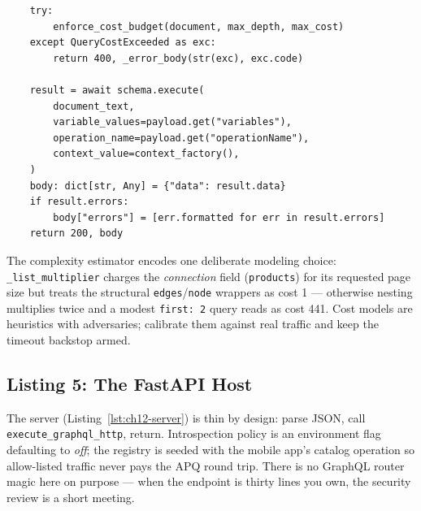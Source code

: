 \begin{verbatim}
    try:
        enforce_cost_budget(document, max_depth, max_cost)
    except QueryCostExceeded as exc:
        return 400, _error_body(str(exc), exc.code)

    result = await schema.execute(
        document_text,
        variable_values=payload.get("variables"),
        operation_name=payload.get("operationName"),
        context_value=context_factory(),
    )
    body: dict[str, Any] = {"data": result.data}
    if result.errors:
        body["errors"] = [err.formatted for err in result.errors]
    return 200, body
\end{verbatim}

The complexity estimator encodes one deliberate modeling choice:
\texttt{\_list\_multiplier} charges the \emph{connection} field
(\texttt{products}) for its requested page size but treats the structural
\texttt{edges}/\texttt{node} wrappers as cost 1 --- otherwise nesting
multiplies twice and a modest \texttt{first: 2} query reads as cost 441.
Cost models are heuristics with adversaries; calibrate them against real
traffic and keep the timeout backstop armed.

\subsection{Listing 5: The FastAPI Host}
\label{subsec:ch12-code-server}

The server (Listing~\ref{lst:ch12-server}) is thin by design: parse JSON,
call \texttt{execute\_graphql\_http}, return. Introspection policy is an
environment flag defaulting to \emph{off}; the registry is seeded with the
mobile app's catalog operation so allow-listed traffic never pays the APQ
round trip. There is no GraphQL router magic here on purpose --- when the
endpoint is thirty lines you own, the security review is a short meeting.

